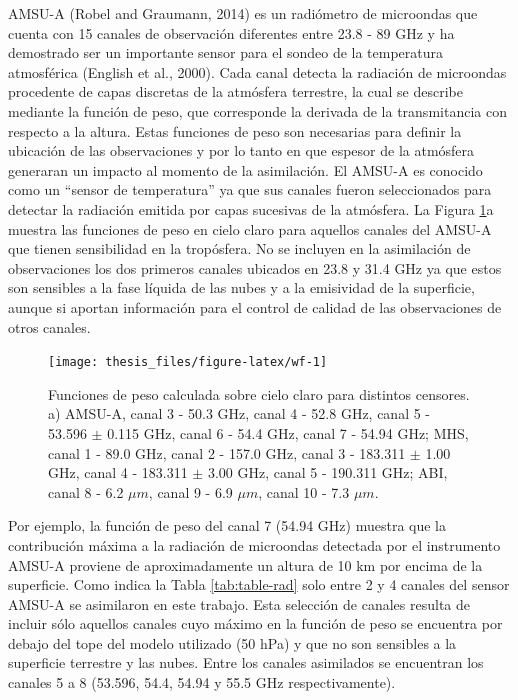 \documentclass[12pt,oneside,a4paper]{reedthesis}
\begin{document}
AMSU-A (Robel and Graumann, 2014) es un radiómetro de microondas que cuenta con 15 canales de observación diferentes entre 23.8 - 89 GHz y ha demostrado ser un importante sensor para el sondeo de la temperatura atmosférica (English et al., 2000). Cada canal detecta la radiación de microondas procedente de capas discretas de la atmósfera terrestre, la cual se describe mediante la función de peso, que corresponde la derivada de la transmitancia con respecto a la altura. Estas funciones de peso son necesarias para definir la ubicación de las observaciones y por lo tanto en que espesor de la atmósfera generaran un impacto al momento de la asimilación. El AMSU-A es conocido como un ``sensor de temperatura'' ya que sus canales fueron seleccionados para detectar la radiación emitida por capas sucesivas de la atmósfera. La Figura \ref{fig:wf}a muestra las funciones de peso en cielo claro para aquellos canales del AMSU-A que tienen sensibilidad en la tropósfera. No se incluyen en la asimilación de observaciones los dos primeros canales ubicados en 23.8 y 31.4 GHz ya que estos son sensibles a la fase líquida de las nubes y a la emisividad de la superficie, aunque si aportan información para el control de calidad de las observaciones de otros canales.


\begin{figure}

{\centering \texttt{[image: thesis\_files/figure-latex/wf-1]} 

}

\caption{Funciones de peso calculada sobre cielo claro para distintos censores. a) AMSU-A, canal 3 - 50.3 GHz, canal 4 - 52.8 GHz, canal 5 - 53.596 \(\pm\) 0.115 GHz, canal 6 - 54.4 GHz, canal 7 - 54.94 GHz; MHS, canal 1 - 89.0 GHz, canal 2 - 157.0 GHz, canal 3 - 183.311 \(\pm\) 1.00 GHz, canal 4 - 183.311 \(\pm\) 3.00 GHz, canal 5 - 190.311 GHz; ABI, canal 8 - 6.2 \(\mu m\), canal 9 - 6.9 \(\mu m\), canal 10 - 7.3 \(\mu m\).}\label{fig:wf}
\end{figure}
Por ejemplo, la función de peso del canal 7 (54.94 GHz) muestra que la contribución máxima a la radiación de microondas detectada por el instrumento AMSU-A proviene de aproximadamente un altura de 10 km por encima de la superficie. Como indica la Tabla \ref{tab:table-rad} solo entre 2 y 4 canales del sensor AMSU-A se asimilaron en este trabajo. Esta selección de canales resulta de incluir sólo aquellos canales cuyo máximo en la función de peso se encuentra por debajo del tope del modelo utilizado (50 hPa) y que no son sensibles a la superficie terrestre y las nubes. Entre los canales asimilados se encuentran los canales 5 a 8 (53.596, 54.4, 54.94 y 55.5 GHz respectivamente).
\end{document}
